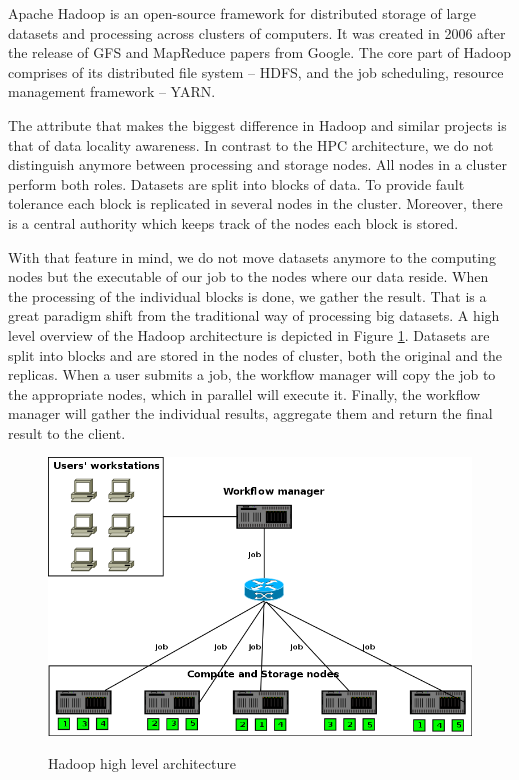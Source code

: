 Apache Hadoop is an open-source framework for distributed storage of
large datasets and processing across clusters of computers. It was
created in 2006 after the release of GFS
\cite{Ghemawat:2003:GFS:1165389.945450} and MapReduce
\cite{Dean:2004:MSD:1251254.1251264} papers from Google. The core part
of Hadoop comprises of its distributed file system -- HDFS, and the
job scheduling, resource management framework -- YARN.

The attribute that makes the biggest difference in Hadoop and similar
projects is that of data locality awareness. In contrast to the HPC
architecture, we do not distinguish anymore between processing and
storage nodes. All nodes in a cluster perform both roles. Datasets are
split into blocks of data. To provide fault tolerance each block is
replicated in several nodes in the cluster. Moreover, there is a
central authority which keeps track of the nodes each block is stored.

With that feature in mind, we do not move datasets anymore to the
computing nodes but the executable of our job to the nodes where our
data reside. When the processing of the individual blocks is done, we
gather the result. That is a great paradigm shift from the traditional way
of processing big datasets. A high level overview of the Hadoop
architecture is depicted in Figure
\ref{fig:hadoop_arch_overview}. Datasets are split into blocks and
are stored in the nodes of cluster, both the original and the
replicas. When a user submits a job, the workflow manager will copy
the job to the appropriate nodes, which in parallel will execute
it. Finally, the workflow manager will gather the individual results,
aggregate them and return the final result to the client.

\begin{figure}
\centering
\includegraphics[scale=0.5]{resources/images/Background/hadoop_arch_overview.png}
\label{fig:hadoop_arch_overview}
\caption{Hadoop high level architecture}
\end{figure}